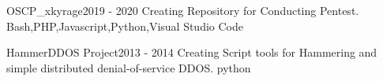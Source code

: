 

\begin{projects}
	\project
	{OSCP_xkyrage}{2019 - 2020}
	{  }
	{Creating Repository for Conducting Pentest.}
	{Bash,PHP,Javascript,Python,Visual Studio Code}
				
	\project
	{HammerDDOS Project}{2013 - 2014}
	{ }
	{Creating Script tools for Hammering and simple distributed denial-of-service {DDOS}. }
	{python}

\end{projects}

